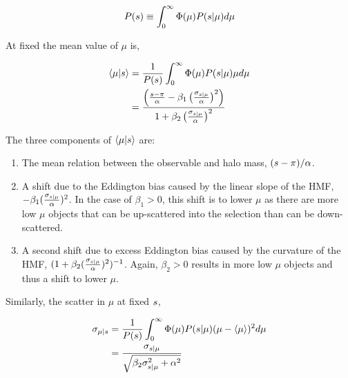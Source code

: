 \documentclass[fleqn,usenatbib,useAMS,english]{mnras}
\begin{document}
    \begin{equation}
        P(s{}) \equiv \int_{0}^{\infty} \Phi(\mu){} P(s{} | \mu) d\mu
    \end{equation}

    At fixed \obsSym{} the mean value of $\mu$ is,

    \begin{equation}
    \begin{aligned}
        \langle \mu | s \rangle
        &= \frac{1}{P(s)}
            \int_{0}^{\infty} \Phi(\mu){} P(s{} | \mu) \mu d\mu \\
        &= \frac{\left( \frac{s- \pi}{\alpha} - \beta_1 \left(\frac{\sigma_{s{} | \mu{}}}{\alpha}\right)^2 \right)}{ 1 + \beta_2 \left(\frac{\sigma_{s{} | \mu{}}}{\alpha}\right)^2}
        \label{eq:mean_of_mu}
    \end{aligned}
    \end{equation}

    \noindent The three components of $\langle \mu | s \rangle$ are:

    \begin{enumerate}

        \item The mean relation between the observable and halo mass, $(s- \pi) /
        \alpha$.

        \item A shift due to the Eddington bias caused by the linear slope of the HMF, $-\beta_1
        (\frac{\sigma_{s{} | \mu{}}}{\alpha})^2$. In the case of $\beta_1 > 0$, this shift is to
        lower $\mu$ as there are more low $\mu$ objects that can be up-scattered into the
        selection than can be down-scattered.

        \item A second shift due to excess Eddington bias caused by the curvature of the HMF, $(1
        + \beta_2 (\frac{\sigma_{s{} | \mu{}}}{\alpha})^2)^{-1}$. Again, $\beta_2 > 0$ results in
        more low $\mu$ objects and thus a shift to lower $\mu$.

    \end{enumerate}

    Similarly, the scatter in $\mu$ at fixed $s$,

    \begin{equation}
    \begin{aligned}
        \sigma_{\mu{} | s{}}{}
        &= \frac{1}{P(s{})}
            \int_{0}^{\infty} \Phi(\mu){} P(s{} | \mu) ( \mu  - \langle \mu \rangle )^2 d\mu \\
    	&= \frac{\sigma_{s{} | \mu{}}}{\sqrt{\beta_2 \sigma_{s{} | \mu{}}^2 + \alpha^2}}
        \label{eq:scatter_of_mu}
    \end{aligned}
    \end{equation}
\end{document}
